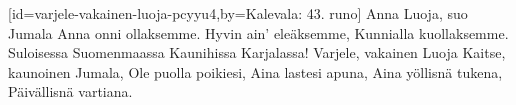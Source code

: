 [id={varjele-vakainen-luoja-pcyyu4},by={Kalevala: 43. runo}]
  \beginverse
    Anna Luoja, suo Jumala
    Anna onni ollaksemme.
    Hyvin ain’ eleäksemme,
    Kunnialla kuollaksemme.
    Suloisessa Suomenmaassa
    Kaunihissa Karjalassa!
  \endverse
  \beginverse
    Varjele, vakainen Luoja
    Kaitse, kaunoinen Jumala,
    Ole puolla poikiesi,
    Aina lastesi apuna,
    Aina yöllisnä tukena,
    Päivällisnä vartiana.
  \endverse
\endsong


